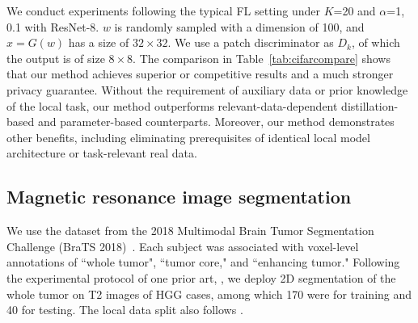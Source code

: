 \documentclass[letterpaper]{article} %
\makeatletter
\DeclareRobustCommand\onedot{\futurelet\@let@token\@onedot}
\def\@onedot{\ifx\@let@token.\else.\null\fi\xspace}
\def\eg{\emph{e.g}\onedot} \def\Eg{\emph{E.g}\onedot}
\makeatother
\begin{document}
We conduct experiments following the typical FL setting \cite{lin2020ensemble} under $K$=20 and $\alpha$=1, 0.1 with ResNet-8. %
$w$ is randomly sampled with a dimension of 100, and $x=G(w)$ has a size of $32 \times 32$. We use a patch discriminator as $D_k$, of which the output is of size $8 \times 8$. 
The comparison in Table~\ref{tab:cifarcompare} shows that our method achieves superior or competitive results and a much stronger privacy guarantee.
Without the requirement of auxiliary data or prior knowledge of the local task, our method outperforms relevant-data-dependent distillation-based and parameter-based counterparts.
Moreover, our method demonstrates other benefits, including eliminating prerequisites of identical local model architecture or task-relevant real data.  

\subsection{Magnetic resonance image segmentation} 
We use the dataset from the 2018 Multimodal Brain Tumor Segmentation Challenge (BraTS 2018)~\cite{menze2014multimodal, bakas2018identifying}. 
Each subject was associated with voxel-level annotations of ``whole tumor", ``tumor core," and ``enhancing tumor." 
Following the experimental protocol of one prior art, \cite{chang2020synthetic}, we deploy 2D segmentation of the whole tumor on T2 images of HGG cases, among which 170 were for training and 40 for testing. The local data split also follows \cite{chang2020synthetic}.%
\end{document}
